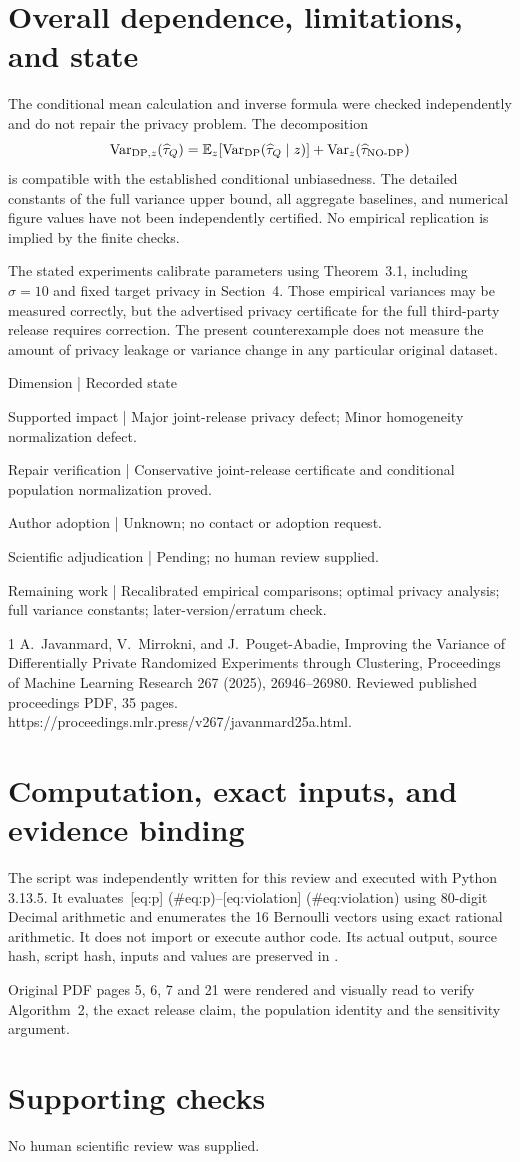\documentclass[10pt]{article}
\begin{document}
\section*{Overall dependence, limitations, and state}
The conditional mean calculation and inverse formula were checked independently and do not repair the privacy problem. The decomposition \[\operatorname{Var}_{\mathrm{DP},z}(\widehat\tau_Q)
 =\mathbb E_z[\operatorname{Var}_{\mathrm{DP}}(\widehat\tau_Q\mid z)]
  +\operatorname{Var}_z(\widehat\tau_{\rm NO\text{-}DP})\] is compatible with the established conditional unbiasedness. The detailed constants of the full variance upper bound, all aggregate baselines, and numerical figure values have not been independently certified. No empirical replication is implied by the finite checks.\par
The stated experiments calibrate parameters using Theorem 3.1, including \(\sigma=10\) and fixed target privacy in Section 4. Those empirical variances may be measured correctly, but the advertised privacy certificate for the full third-party release requires correction. The present counterexample does not measure the amount of privacy leakage or variance change in any particular original dataset.\par
Dimension | Recorded state\par
Supported impact | Major joint-release privacy defect; Minor homogeneity normalization defect.\par
Repair verification | Conservative joint-release certificate and conditional population normalization proved.\par
Author adoption | Unknown; no contact or adoption request.\par
Scientific adjudication | Pending; no human review supplied.\par
Remaining work | Recalibrated empirical comparisons; optimal privacy analysis; full variance constants; later-version/erratum check.\par
1 A. Javanmard, V. Mirrokni, and J. Pouget-Abadie, Improving the Variance of Differentially Private Randomized Experiments through Clustering, Proceedings of Machine Learning Research 267 (2025), 26946–26980. Reviewed published proceedings PDF, 35 pages. https://proceedings.mlr.press/v267/javanmard25a.html.\par
\section*{Computation, exact inputs, and evidence binding}
The script was independently written for this review and executed with Python 3.13.5. It evaluates [eq:p] (\#eq:p)–[eq:violation] (\#eq:violation) using 80-digit Decimal arithmetic and enumerates the 16 Bernoulli vectors using exact rational arithmetic. It does not import or execute author code. Its actual output, source hash, script hash, inputs and values are preserved in .\par
Original PDF pages 5, 6, 7 and 21 were rendered and visually read to verify Algorithm 2, the exact release claim, the population identity and the sensitivity argument.\par
\section*{Supporting checks}
No human scientific review was supplied.\par
\end{document}
